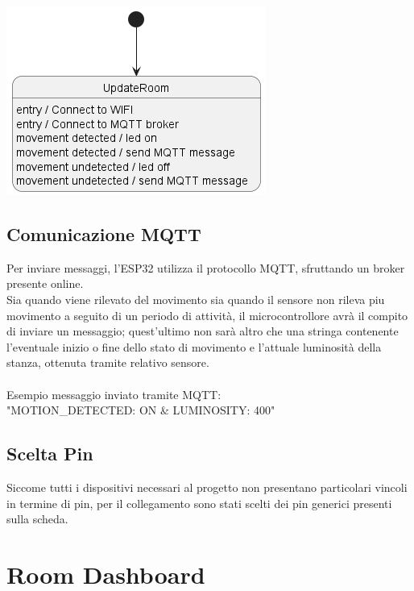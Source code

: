 \documentclass[a4paper]{report}
\begin{document}
\vspace{2cm}
\begin{center}
   \includegraphics[scale=1]{images/sensor-board-state-scheme.png}
\end{center}

\newpage

\section{Comunicazione MQTT}
Per inviare messaggi, l'ESP32 utilizza il protocollo MQTT, sfruttando un broker presente online.\\
Sia quando viene rilevato del movimento sia quando il sensore non rileva piu movimento a seguito di un periodo di attività, il microcontrollore avrà il compito di inviare un messaggio; quest'ultimo non sarà altro che una stringa contenente l'eventuale inizio o fine dello stato di movimento e l'attuale luminosità della stanza, ottenuta tramite relativo sensore.\\
\vspace{1cm} \\
Esempio messaggio inviato tramite MQTT: \\
"MOTION\_DETECTED: ON \& LUMINOSITY: 400"
\vspace{1cm}
\section{Scelta Pin}
Siccome tutti i dispositivi necessari al progetto non presentano particolari vincoli in termine di pin, per il collegamento sono stati scelti dei pin generici presenti sulla scheda.



\chapter{Room Dashboard}
\vspace{1cm}
\end{document}
